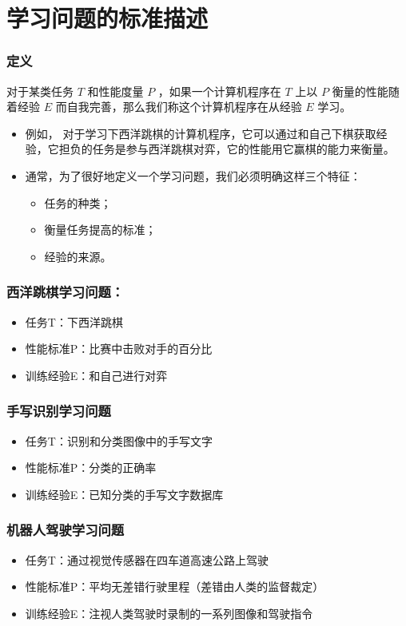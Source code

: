 \documentclass{beamer}
\begin{document}
\section{学习问题的标准描述}
\label{sec-3}
\begin{frame}
\frametitle{定义}
\label{sec-3-1}

对于某类任务 $T$ 和性能度量 $P$ ，如果一个计算机程序在 $T$ 上以 $P$ 衡量的性能随着经验 $E$ 而自我完善，那么我们称这个计算机程序在从经验 $E$ 学习。

\begin{itemize}
\item 例如， 对于学习下西洋跳棋的计算机程序，它可以通过和自己下棋获取经验，它担负的任务是参与西洋跳棋对弈，它的性能用它赢棋的能力来衡量。
\item 通常，为了很好地定义一个学习问题，我们必须明确这样三个特征：
\begin{itemize}
\item 任务的种类；
\item 衡量任务提高的标准；
\item 经验的来源。
\end{itemize}
\end{itemize}
\end{frame}
\begin{frame}
\frametitle{西洋跳棋学习问题：}
\label{sec-3-2}

\begin{itemize}
\item 任务T：下西洋跳棋
\item 性能标准P：比赛中击败对手的百分比
\item 训练经验E：和自己进行对弈
\end{itemize}
\end{frame}
\begin{frame}
\frametitle{手写识别学习问题}
\label{sec-3-3}

\begin{itemize}
\item 任务T：识别和分类图像中的手写文字
\item 性能标准P：分类的正确率
\item 训练经验E：已知分类的手写文字数据库
\end{itemize}
\end{frame}
\begin{frame}
\frametitle{机器人驾驶学习问题}
\label{sec-3-4}

\begin{itemize}
\item 任务T：通过视觉传感器在四车道高速公路上驾驶
\item 性能标准P：平均无差错行驶里程（差错由人类的监督裁定）
\item 训练经验E：注视人类驾驶时录制的一系列图像和驾驶指令
\end{itemize}
\end{frame}
\end{document}
